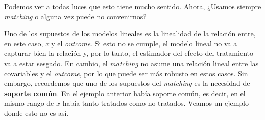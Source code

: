 \documentclass[
  letterpaper,
  DIV=11,
  numbers=noendperiod,
  oneside]{scrreprt}
\begin{document}
Podemos ver a todas luces que esto tiene mucho sentido. Ahora, ¿Usamos
siempre \emph{matching} o alguna vez puede no convenirnos?

Uno de los supuestos de los modelos lineales es la linealidad de la
relación entre, en este caso, \emph{x} y el \emph{outcome}. Si esto no
se cumple, el modelo lineal no va a capturar bien la relación y, por lo
tanto, el estimador del efecto del tratamiento va a estar sesgado. En
cambio, el \emph{matching} no asume una relación lineal entre las
covariables y el \emph{outcome}, por lo que puede ser más robusto en
estos casos. Sin embargo, recordemos que uno de los supuestos del
\emph{matching} es la necesidad de \textbf{soporte común}. En el ejemplo
anterior había soporte común, es decir, en el mismo rango de \(x\) había
tanto tratados como no tratados. Veamos un ejemplo donde esto no es así.
\end{document}
